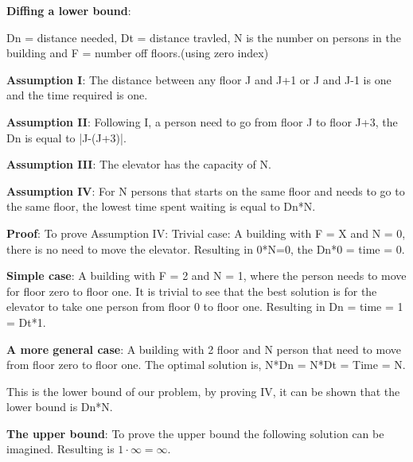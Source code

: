 
\textbf{Diffing a lower bound}:

Dn = distance needed, Dt = distance travled, N is the number on persons in the building and F = number off floors.(using zero index)

\textbf{Assumption I}: The distance between any floor J and J+1 or J and J-1 is one and the time required is one.

\textbf{Assumption II}: Following I, a person need to go from floor J to floor J+3, the Dn is equal to |J-(J+3)|.

\textbf{Assumption III}: The elevator has the capacity of N.

\textbf{Assumption IV}: For N persons that starts on the same floor and needs to go to the same floor, the lowest time spent waiting is equal to Dn*N.

\textbf{Proof}:
To prove Assumption IV:
Trivial case: A building with F = X and N = 0, there is no need to move the elevator. Resulting in 0*N=0, the Dn*0 = time = 0.

\textbf{Simple case}: A building with F = 2 and N = 1, where the person needs to move for floor zero to floor one. It is trivial to see that the best solution is for the elevator to take one person from floor 0 to floor one. Resulting in Dn = time = 1 = Dt*1.

\textbf{A more general case}:
A building with 2 floor and N person that need to move from floor zero to floor one. The optimal solution is, N*Dn = N*Dt = Time = N.

This is the lower bound of our problem, by proving IV, it can be shown that the lower bound is Dn*N.

\textbf{The upper bound}:
To prove the upper bound the following solution can be imagined. Resulting is \( 1 \cdot \infty = \infty \).

